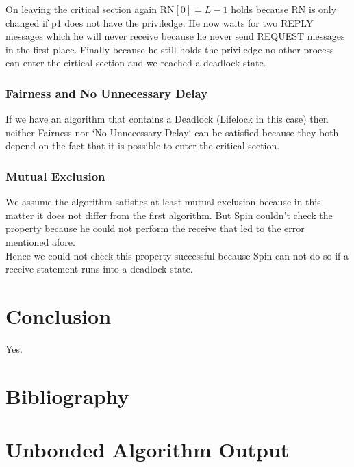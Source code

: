 \documentclass{llncs}
\begin{document}
On leaving the critical section again $\text{RN}[0] = L - 1$ holds because RN is only changed
if p1 does not have the priviledge. He now waits for two REPLY messages which he will never
receive because he never send REQUEST messages in the first place. Finally because he still
holds the priviledge no other process can enter the cirtical section and we reached a deadlock state.

\subsubsection{Fairness and No Unnecessary Delay}

If we have an algorithm that contains a Deadlock (Lifelock in this case) then neither 
Fairness nor `No Unnecessary Delay` can be satisfied because they both
depend on the fact that it is possible to enter the critical section.

\subsubsection{Mutual Exclusion}

We assume the algorithm satisfies at least mutual exclusion because in this matter it does not
differ from the first algorithm. But Spin couldn't check the property
because he could not perform the receive that led to the error mentioned afore.\\

Hence we could not check this property successful because Spin can not do so if a receive statement
runs into a deadlock state.

\section{Conclusion}

Yes.

\section{Bibliography}




\appendix

\section{Unbonded Algorithm Output}
\end{document}
